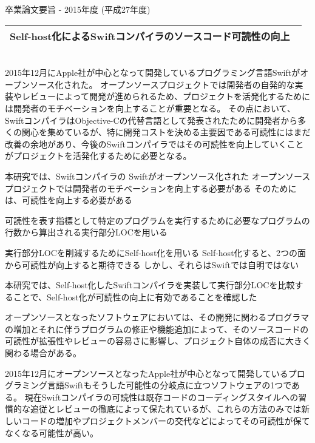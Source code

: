 卒業論文要旨 - 2015年度 (平成27年度)
\begin{center}
\begin{large}
\begin{tabular}{|M{0.97\linewidth}|}
    \hline
    Self-host化によるSwiftコンパイラのソースコード可読性の向上\\
    \hline
\end{tabular}
\end{large}
\end{center}

~ \\

2015年12月にApple社が中心となって開発しているプログラミング言語Swiftがオープンソース化された。
オープンソースプロジェクトでは開発者の自発的な実装やレビューによって開発が進められるため、プロジェクトを活発化するためには開発者のモチベーションを向上することが重要となる。
その点において、SwiftコンパイラはObjective-Cの代替言語として発表されたために開発者から多くの関心を集めているが、特に開発コストを決める主要因である可読性にはまだ改善の余地があり、今後のSwiftコンパイラではその可読性を向上していくことがプロジェクトを活発化するために必要となる。

本研究では、Swiftコンパイラの
Swiftがオープンソース化された
オープンソースプロジェクトでは開発者のモチベーションを向上する必要がある
そのためには、可読性を向上する必要がある

可読性を表す指標として特定のプログラムを実行するために必要なプログラムの行数から算出される実行部分LOCを用いる

実行部分LOCを削減するためにSelf-host化を用いる
Self-host化すると、2つの面から可読性が向上すると期待できる
しかし、それらはSwiftでは自明ではない

本研究では、Self-host化したSwiftコンパイラを実装して実行部分LOCを比較することで、Self-host化が可読性の向上に有効であることを確認した

オープンソースとなったソフトウェアにおいては、その開発に関わるプログラマの増加とそれに伴うプログラムの修正や機能追加によって、そのソースコードの可読性が拡張性やレビューの容易さに影響し、プロジェクト自体の成否に大きく関わる場合がある。

2015年12月にオープンソースとなったApple社が中心となって開発しているプログラミング言語Swiftもそうした可能性の分岐点に立つソフトウェアの1つである。
現在Swiftコンパイラの可読性は既存コードのコーディングスタイルへの習慣的な追従とレビューの徹底によって保たれているが、これらの方法のみでは新しいコードの増加やプロジェクトメンバーの交代などによってその可読性が保てなくなる可能性が高い。

